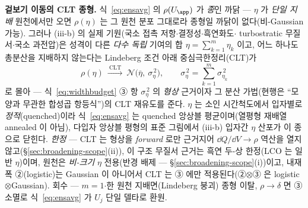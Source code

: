 \begin{bgbox}
\textbf{겉보기 이동의 CLT 종형.} 식~\eqref{eq:ensavg} 의 $\rho(U_\app)$ 가 \emph{종}인 까닭 ---
$\eta$ 가 \emph{단일 지배} 원천에서만 오면 $\rho(\eta)$ 는 그 원천 분포 그대로라 종형일 까닭이
없다(비-Gaussian 가능). 그러나 (iii-b) 의 실제 기원(국소 접촉 저항$\cdot$결정성$\cdot$흑연화도$\cdot$%
turbostratic 무질서$\cdot$국소 과전압)은 성격이 다른 \emph{다수 독립} 기여의 합 $\eta=\sum_{k=1}^{m}\eta_k$
이고, 어느 하나도 총분산을 지배하지 않는다는 Lindeberg 조건 아래 중심극한정리(CLT)가
\[
\rho(\eta)\ \xrightarrow{\ \text{CLT}\ }\ \mathcal N\!\big(\bar\eta,\ \sigma_\eta^{\,2}\big),
\qquad
\sigma_\eta^{\,2}=\sum_{k=1}^{m}\sigma_{\eta_k}^{\,2}
\]
로 몰아 --- 식~\eqref{eq:widthbudget} ③ 항 $\sigma_\eta^{\,2}$ 의 \emph{형상} 근거이자 그 분산
가법(현행은 ``모양과 무관한 합성곱 항등식'')의 CLT 재유도를 준다. $\eta$ 는 소인 시간척도에서 입자별로
\emph{정적}(quenched)이라 식~\eqref{eq:ensavg} 는 quenched 앙상블 평균이며(열평형 재배열 annealed 이
아님), 다입자 앙상블 평형의 표준 그림\cite{dreyer2010,dreyer2011}에서 (iii-b) 입자간 $\eta$ 산포가 이
종으로 닫힌다. \emph{한정} --- CLT 는 형상을 \emph{forward} 로만 근거지어 $\dd Q/\dd V\!\to\!\rho$
역산을 열지 않고(\S\ref{sec:broadening-scope}(ii)), 이 구조 무질서 근거는 흑연 두-상 한정(LCO 는 일반
$\eta$)이며, 원천은 \emph{비-크기} $\eta$ 전용(반경 배제 --- \S\ref{sec:broadening-scope}(i))이고,
내재 폭 ②(logistic)는 Gaussian 이 아니어서 CLT 는 ③ 에만 적용된다(②$\otimes$③ 은
logistic$\otimes$Gaussian). 회수 --- $m=1$$\cdot$한 원천 지배면(Lindeberg 붕괴) 종형 이탈,
$\rho\!\to\!\delta$ 면 ③ 소멸로 식~\eqref{eq:ensavg} 가 $U_j$ 단일 델타로 환원.
\end{bgbox}





